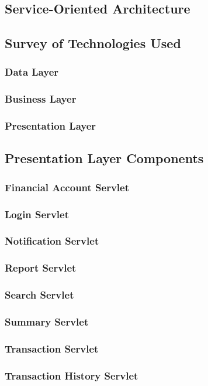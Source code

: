 \documentclass{article}
\begin{document}
\subsection{Service-Oriented Architecture}
\subsection{Survey of Technologies Used}
\subsubsection{Data Layer}
\subsubsection{Business Layer}
\subsubsection{Presentation Layer}
\subsection{Presentation Layer Components}
\subsubsection{Financial Account Servlet}
\subsubsection{Login Servlet}
\subsubsection{Notification Servlet}
\subsubsection{Report Servlet}
\subsubsection{Search Servlet}
\subsubsection{Summary Servlet}
\subsubsection{Transaction Servlet}
\subsubsection{Transaction History Servlet   }
\end{document}
